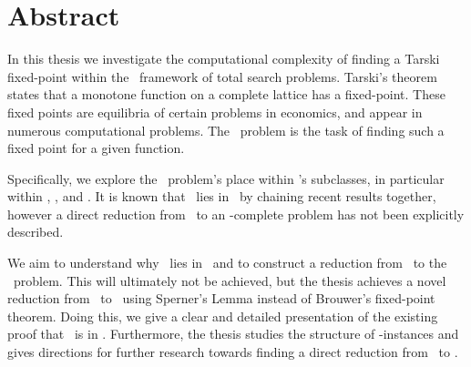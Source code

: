 \chapter*{Abstract}

In this thesis we investigate the computational complexity of finding a Tarski fixed-point within the \TFNP\ framework of total search problems. Tarski's theorem states that a monotone function on a complete lattice has a fixed-point. These fixed points are equilibria of certain problems in economics, and appear in numerous computational problems. The \Tarski\ problem is the task of finding such a fixed point for a given function. 

Specifically, we explore the \Tarski\ problem's place within \TFNP's subclasses, in particular within \PPAD, \PLS, and \EOPL\@. It is known that \Tarski\ lies in \EOPL\ by chaining recent results together, however a direct reduction from \Tarski\ to an \EOPL-complete problem has not been explicitly described.

We aim to understand why \Tarski\ lies in \EOPL\ and to construct a reduction from \Tarski\ to the \EndOfPotentialLine\ problem. This will ultimately not be achieved, but the thesis achieves a novel reduction from \Tarski\ to \EndOfLine\ using Sperner's Lemma instead of Brouwer's fixed-point theorem. Doing this, we give a clear and detailed  presentation of the existing proof that \Sperner\ is in \PPAD\@. Furthermore, the thesis studies the structure of \Tarski-instances and gives directions for further research towards finding a direct reduction from \Tarski\ to \EndOfPotentialLine\@.